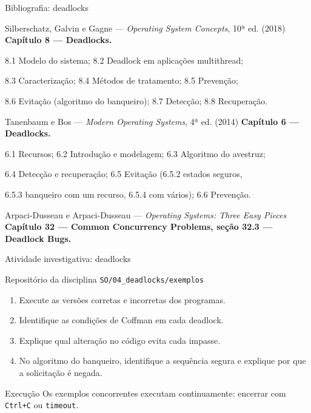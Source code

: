 \documentclass[aspectratio=169,11pt]{beamer}
\begin{document}
\begin{frame}{Bibliografia: deadlocks}
\small
\begin{block}{Silberschatz, Galvin e Gagne — \emph{Operating System Concepts}, 10ª ed. (2018)}
\textbf{Capítulo 8 — Deadlocks.}\par
\footnotesize
8.1 Modelo do sistema; 8.2 Deadlock em aplicações multithread;\par
8.3 Caracterização; 8.4 Métodos de tratamento; 8.5 Prevenção;\par
8.6 Evitação (algoritmo do banqueiro); 8.7 Detecção; 8.8 Recuperação.
\end{block}
\begin{block}{Tanenbaum e Bos — \emph{Modern Operating Systems}, 4ª ed. (2014)}
\textbf{Capítulo 6 — Deadlocks.}\par
\footnotesize
6.1 Recursos; 6.2 Introdução e modelagem; 6.3 Algoritmo do avestruz;\par
6.4 Detecção e recuperação; 6.5 Evitação (6.5.2 estados seguros,\par
6.5.3 banqueiro com um recurso, 6.5.4 com vários); 6.6 Prevenção.
\end{block}
\begin{block}{Arpaci-Dusseau e Arpaci-Dusseau — \emph{Operating Systems: Three Easy Pieces}}
\textbf{Capítulo 32 — Common Concurrency Problems, seção 32.3 — Deadlock Bugs.}
\end{block}
\end{frame}

\begin{frame}{Atividade investigativa: deadlocks}
\begin{block}{Repositório da disciplina}
\texttt{SO/04\_deadlocks/exemplos}
\end{block}
\begin{enumerate}
\setlength\itemsep{.7em}
\item Execute as versões corretas e incorretas dos programas.
\item Identifique as condições de Coffman em cada deadlock.
\item Explique qual alteração no código evita cada impasse.
\item No algoritmo do banqueiro, identifique a sequência segura e explique por que a solicitação é negada.
\end{enumerate}
\begin{alertblock}{Execução}
Os exemplos concorrentes executam continuamente: encerrar com \texttt{Ctrl+C} ou \texttt{timeout}.
\end{alertblock}
\end{frame}
\end{document}
